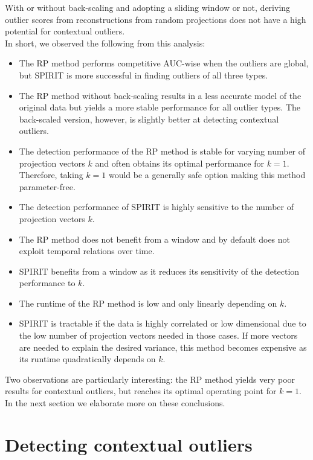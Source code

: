 With or without back-scaling and adopting a sliding window or not, deriving outlier scores from reconstructions from random projections does not have a high potential for contextual outliers. \\

\noindent In short, we observed the following from this analysis:
\begin{itemize}
	\itemsep-0.2em
	\item The RP method performs competitive AUC-wise when the outliers are global, but SPIRIT is more successful in finding outliers of all three types.
	\item The RP method without back-scaling results in a less accurate model of the original data but yields a more stable performance for all outlier types. The back-scaled version, however, is slightly better at detecting contextual outliers.
	\item The detection performance of the RP method is stable for varying number of projection vectors $k$ and often obtains its optimal performance for $k=1$. Therefore, taking $k=1$ would be a generally safe option making this method parameter-free.	
	\item The detection performance of SPIRIT is highly sensitive to the number of projection vectors $k$.
	\item The RP method does not benefit from a window and by default does not exploit temporal relations over time. 
	\item SPIRIT benefits from a window as it reduces its sensitivity of the detection performance to $k$.
	\item The runtime of the RP method is low and only linearly depending on $k$.
	\item SPIRIT is tractable if the data is highly correlated or low dimensional due to the low number of projection vectors needed in those cases. If more vectors are needed to explain the desired variance, this method becomes expensive as its runtime quadratically depends on $k$.
\end{itemize}

Two observations are particularly interesting: the RP method yields very poor results for contextual outliers, but reaches its optimal operating point for $k=1$. In the next section we elaborate more on these conclusions.


\section{Detecting contextual outliers}
\label{sec:analysis_contextual}

